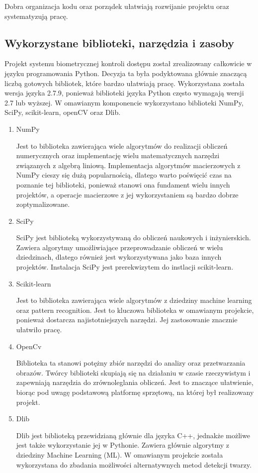 \documentclass[oneside, eng]{mgr}
\begin{document}
Dobra organizacja kodu oraz porządek ułatwiają rozwijanie projektu oraz systematyzują pracę. 

\subsection{Wykorzystane biblioteki, narzędzia i zasoby}
Projekt systemu biometrycznej kontroli dostępu został zrealizowany całkowicie w języku programowania Python. Decyzja ta była podyktowana głównie znaczącą liczbą gotowych bibliotek, które bardzo ułatwiają pracę. Wykorzystana została wersja języka 2.7.9, ponieważ biblioteki języka Python często wymagają wersji 2.7 lub wyższej. W omawianym komponencie wykorzystano biblioteki NumPy, SciPy, scikit-learn, openCV oraz Dlib.
\begin{enumerate}
\item NumPy

Jest to biblioteka zawierająca wiele algorytmów do realizacji obliczeń numerycznych oraz implementację wielu matematycznych narzędzi związanych z algebrą liniową. Implementacja algorytmów macierzowych z NumPy cieszy się dużą popularnością, dlatego warto poświęcić czas na poznanie tej biblioteki, ponieważ stanowi ona fundament wielu innych projektów, a operacje macierzowe z jej wykorzystaniem są bardzo dobrze zoptymalizowane.

\item SciPy

SciPy jest biblioteką wykorzystywaną do obliczeń naukowych i inżynierskich. Zawiera algorytmy umożliwiające przeprowadzanie obliczeń w wielu dziedzinach, dlatego również jest wykorzystywana jako baza innych projektów. Instalacja SciPy jest prerekwizytem do instlacji scikit-learn. 

\item Scikit-learn 

Jest to biblioteka zawierająca wiele algorytmów z dziedziny machine learning oraz pattern recognition. Jest to kluczowa biblioteka w omawianym projekcie, ponieważ dostarcza najistotniejszych narzędzi. Jej zastosowanie znacznie ułatwiło pracę.

\item OpenCv

Biblioteka ta stanowi potężny zbiór narzędzi do analizy oraz przetwarzania obrazów. Twórcy biblioteki skupiają się na działaniu w czasie rzeczywistym i zapewniają narzędzia do zrównoleglania obliczeń. Jest to znaczące ułatwienie, biorąc pod uwagę podstawową platformę sprzętową, na której był realizowany projekt. 

\item Dlib 

Dlib jest biblioteką przewidzianą głównie dla języka C++, jednakże możliwe jest także wykorzystanie jej w Pythonie. Zawiera głównie algorytmy z dziedziny Machine Learning (ML). W omawianym projekcie została wykorzystana do zbadania możliwości alternatywnych metod detekcji twarzy.

\end{enumerate}
\end{document}

